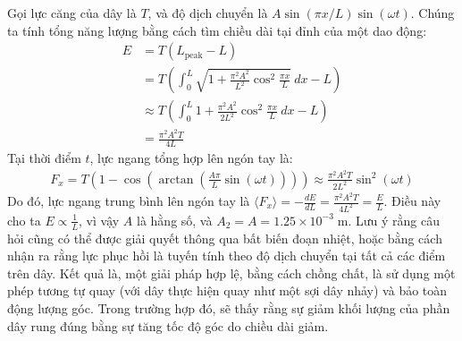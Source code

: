 \begin{solution}
Gọi lực căng của dây là $T$, và độ dịch chuyển là $A\sin(\pi x/L)\sin(\omega t)$. Chúng ta tính tổng năng lượng bằng cách tìm chiều dài tại đỉnh của một dao động:
\begin{align*}E&=T(L_{\text{peak}} - L)\\ &=T\left(\int_0^L\sqrt{1 + \frac{\pi^2 A^2}{L^2}\cos^2\frac{\pi x}{L}}\ dx - L\right)\\ &\approx T\left(\int_0^L 1 + \frac{\pi^2 A^2}{2L^2}\cos^2\frac{\pi x}{L}\ dx - L\right)\\ &= \frac{\pi^2 A^2 T}{4L}\end{align*}
Tại thời điểm $t$, lực ngang tổng hợp lên ngón tay là:
\begin{align*}F_x = T\left(1 - \cos\left(\arctan\left(\frac{A\pi}{L}\sin(\omega t)\right)\right)\right)\approx \frac{\pi^2 A^2 T}{2L^2}\sin^2(\omega t)\end{align*}
Do đó, lực ngang trung bình lên ngón tay là $\displaystyle \langle F_x\rangle = -\frac{dE}{dL} = \frac{\pi^2 A^2 T}{4L^2} = \frac{E}{L}$. Điều này cho ta $\displaystyle E \propto \frac{1}{L}$, vì vậy $A$ là hằng số, và $A_2=A=\boxed{1.25\times 10^{-3}\;\mathrm{m}}.$
\newline
\newline
Lưu ý rằng câu hỏi cũng có thể được giải quyết thông qua bất biến đoạn nhiệt, hoặc bằng cách nhận ra rằng lực phục hồi là tuyến tính theo độ dịch chuyển tại tất cả các điểm trên dây. Kết quả là, một giải pháp hợp lệ, bằng cách chồng chất, là sử dụng một phép tương tự quay (với dây thực hiện quay như một sợi dây nhảy) và bảo toàn động lượng góc. Trong trường hợp đó, sẽ thấy rằng sự giảm khối lượng của phần dây rung đúng bằng sự tăng tốc độ góc do chiều dài giảm.  

\end{solution}
